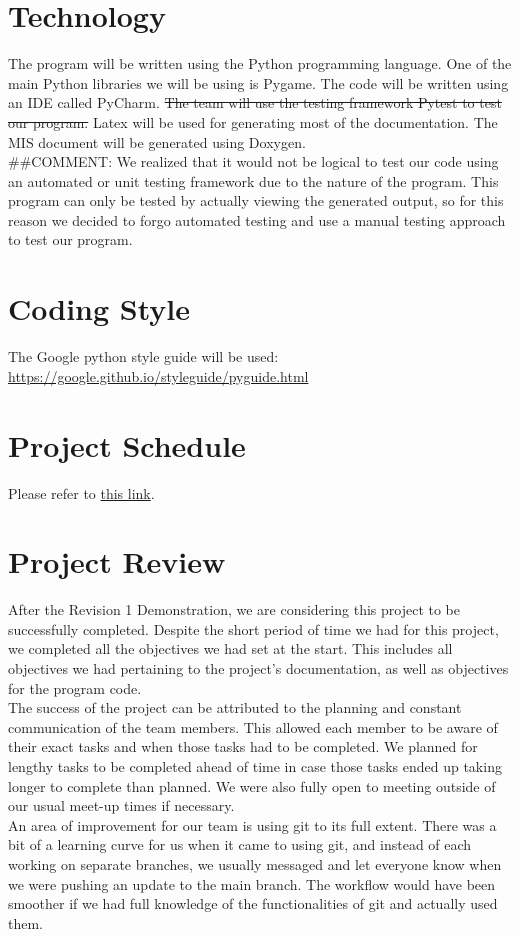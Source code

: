 \documentclass{article}
\begin{document}
\section{Technology}

The program will be written using the Python programming language. One of the main Python libraries we will be using is Pygame. The code will be written using an IDE called PyCharm. \st{The team will use the testing framework Pytest to test our program.} \color{red} Latex will be used for generating most of the documentation. The MIS document will be generated using Doxygen.\\

\noindent \#\#COMMENT: We realized that it would not be logical to test our code using an automated or unit testing framework due to the nature of the program. This program can only be tested by actually viewing the generated output, so for this reason we decided to forgo automated testing and use a manual testing approach to test our program.\color{black}

\section{Coding Style}

The Google python style guide will be used: \url{https://google.github.io/styleguide/pyguide.html}

\section{Project Schedule}

Please refer to
\href{https://gitlab.cas.mcmaster.ca/3xa3-l3-g10/3xa3-l3-g10/-/tree/main/ProjectSchedule}{this link}.

\section{Project Review}
\color{red} After the Revision 1 Demonstration, we are considering this project to be successfully completed. Despite the short period of time we had for this project, we completed all the objectives we had set at the start. This includes all objectives we had pertaining to the project's documentation, as well as objectives for the program code.\\

\noindent The success of the project can be attributed to the planning and constant communication of the team members. This allowed each member to be aware of their exact tasks and when those tasks had to be completed. We planned for lengthy tasks to be completed ahead of time in case those tasks ended up taking longer to complete than planned. We were also fully open to meeting outside of our usual meet-up times if necessary.\\

\noindent An area of improvement for our team is using git to its full extent. There was a bit of a learning curve for us when it came to using git, and instead of each working on separate branches, we usually messaged and let everyone know when we were pushing an update to the main branch. The workflow would have been smoother if we had full knowledge of the functionalities of git and actually used them.
\end{document}
